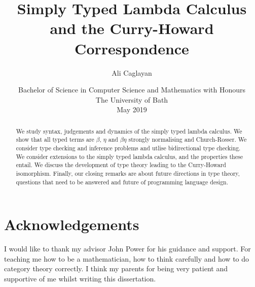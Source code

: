 \documentclass{article}
\title{Simply Typed Lambda Calculus and the Curry-Howard Correspondence}
\author{Ali Caglayan}
\date{Bachelor of Science in Computer Science and Mathematics with Honours\\The University of Bath\\May 2019}
\theoremstyle{definition}
\begin{document}
%
\setcounter{page}{0}


\maketitle
\newpage


\newpage

\newpage

\begin{abstract}
    We study syntax, judgements and dynamics of the simply typed lambda calculus. We show that all typed terms are $\beta$, $\eta$ and $\beta\eta$ strongly normalising and Church-Rosser. We consider type checking and inference problems and utlise bidirectional type checking. We consider extensions to the simply typed lambda calculus, and the properties these entail. We discuss the development of type theory leading to the Curry-Howard isomorphism. Finally, our closing remarks are about future directions in type theory, questions that need to be answered and future of programming language design.
\end{abstract}
\newpage

\tableofcontents
\newpage

\section*{Acknowledgements}
I would like to thank my advisor John Power for his guidance and support. For teaching me how to be a mathematician, how to think carefully and how to do category theory correctly. I think my parents for being very patient and supportive of me whilst writing this dissertation.

\newpage

\setcounter{page}{1}








\end{document}
